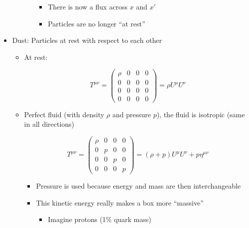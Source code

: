 \begin{itemize}
\begin{itemize}
\begin{itemize}
            \begin{itemize}

              \item There is now a flux across $x$ and $x'$

              \item Particles are no longer ``at rest''

            \end{itemize}

        \end{itemize}

    \end{itemize}

  \item Dust: Particles at rest with respect to each other

    \begin{itemize}

      \item At rest:

        $$T^{\mu\nu}=\left( \begin{array}{cccc}\rho & 0 & 0 & 0\\ 0 & 0 & 0 & 0\\0 & 0 & 0 & 0\\0 & 0 & 0 & 0\end{array} \right)=\rho U^{\mu}U^{\nu}$$

      \item Perfect fluid (with density $\rho$ and pressure $p$), the fluid is isotropic (same in all directions)

        $$T^{\mu\nu}=\left( \begin{array}{cccc}\rho & 0 & 0 & 0\\ 0 & p & 0 & 0\\0 & 0 & p & 0\\0 & 0 & 0 & p\end{array} \right)=(\rho+p) U^{\mu}U^{\nu}+p\eta^{\mu\nu}$$

        \begin{itemize}

          \item Pressure is used because energy and mass are then interchangeable

          \item This kinetic energy really makes a box more ``massive''

            \begin{itemize}

              \item Imagine protons (1\% quark mass)


\end{itemize}
\end{itemize}
\end{itemize}
\end{itemize}

